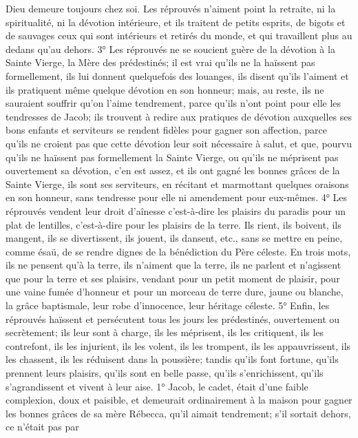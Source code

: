 Dieu demeure toujours chez soi. Les réprouvés n'aiment point la retraite, ni la spiritualité, ni la dévotion intérieure,
et ils traitent de petits esprits, de bigots et de sauvages ceux qui sont intérieurs et retirés du monde, et qui
travaillent plus au dedans qu'au dehors.
 3° Les réprouvés ne se soucient guère de la dévotion à la Sainte Vierge, la Mère des prédestinés; il est vrai
qu'ils ne la haïssent pas formellement, ils lui donnent quelquefois des louanges, ils disent qu'ils l'aiment et ils
pratiquent même quelque dévotion en son honneur; mais, au reste, ils ne sauraient souffrir qu'on l'aime
tendrement, parce qu'ils n'ont point pour elle les tendresses de Jacob; ils trouvent à redire aux pratiques de
dévotion auxquelles ses bons enfants et serviteurs se rendent fidèles pour gagner son affection, parce qu'ils ne
croient pas que cette dévotion leur soit nécessaire à salut, et que, pourvu qu'ils ne haïssent pas formellement la
Sainte Vierge, ou qu'ils ne méprisent pas ouvertement sa dévotion, c'en est assez, et ils ont gagné les bonnes
grâces de la Sainte Vierge, ils sont ses serviteurs, en récitant et marmottant quelques oraisons en son honneur,
sans tendresse pour elle ni amendement pour eux-mêmes.
 4° Les réprouvés vendent leur droit d'aînesse c'est-à-dire les plaisirs du paradis pour un plat de lentilles,
c'est-à-dire pour les plaisirs de la terre. Ils rient, ils boivent, ils mangent, ils se divertissent, ils jouent, ils dansent,
etc., sans se mettre en peine, comme ésaü, de se rendre dignes de la bénédiction du Père céleste. En trois mots,
ils ne pensent qu'à la terre, ils n'aiment que la terre, ils ne parlent et n'agissent que pour la terre et ses plaisirs,
vendant pour un petit moment de plaisir, pour une vaine fumée d'honneur et pour un morceau de terre dure, jaune
ou blanche, la grâce baptismale, leur robe d'innocence, leur héritage céleste.
 5° Enfin, les réprouvés haïssent et persécutent tous les jours les prédestinés, ouvertement ou secrètement;
ils leur sont à charge, ils les méprisent, ils les critiquent, ils les contrefont, ils les injurient, ils les volent, ils les
trompent, ils les appauvrissent, ils les chassent, ils les réduisent dans la poussière; tandis qu'ils font fortune, qu'ils
prennent leurs plaisirs, qu'ils sont en belle passe, qu'ils s'enrichissent, qu'ils s'agrandissent et vivent à leur aise.
 1° Jacob, le cadet, était d'une faible complexion, doux et paisible, et demeurait ordinairement à la maison
pour gagner les bonnes grâces de sa mère Rébecca, qu'il aimait tendrement; s'il sortait dehors, ce n'était pas par
